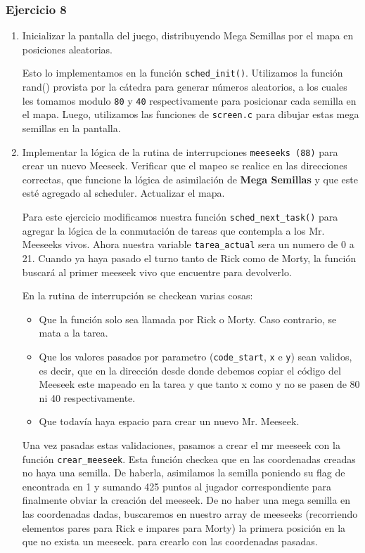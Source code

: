 \documentclass[a4paper]{article}
\begin{document}
\subsubsection{Ejercicio 8}

\begin{enumerate}
	\item Inicializar la pantalla del juego, distribuyendo Mega Semillas por el mapa en posiciones aleatorias.
	
	Esto lo implementamos en la funci\'on \texttt{sched\_init()}. Utilizamos la funci\'on rand() provista por la c\'atedra para generar números aleatorios, a los cuales les tomamos modulo \texttt{80} y \texttt{40} respectivamente para posicionar cada semilla en el mapa. Luego, utilizamos las funciones de \texttt{screen.c} para dibujar estas mega semillas en la pantalla.
	
	\item Implementar la l\'ogica de la rutina de interrupciones \texttt{meeseeks (88)} para crear un nuevo Meeseek. Verificar que el mapeo se realice en las direcciones correctas, que funcione la l\'ogica de asimilaci\'on de \textbf{Mega Semillas} y que este est\'e agregado al scheduler. Actualizar el mapa.
	
	Para este ejercicio modificamos nuestra funci\'on \texttt{sched\_next\_task()} para agregar la lógica de la conmutaci\'on de tareas que contempla a los Mr. Meeseeks vivos. Ahora nuestra variable \texttt{tarea\_actual} sera un numero de 0 a 21. Cuando ya haya pasado el turno tanto de Rick como de Morty, la funci\'on buscar\'a al primer meeseek vivo que encuentre para devolverlo.
	
	En la rutina de interrupci\'on se checkean varias cosas: 
	
	\begin{itemize}
		\item Que la funci\'on solo sea llamada por Rick o Morty. Caso contrario, se mata a la tarea.
		\item Que los valores pasados por parametro (\texttt{code\_start}, \texttt{x} e \texttt{y}) sean validos, es decir, que en la dirección desde donde debemos copiar el código del Meeseek este mapeado en la tarea y que tanto x como y no se pasen de 80 ni 40 respectivamente.
		\item Que todavía haya espacio para crear un nuevo Mr. Meeseek.
	\end{itemize}
	
	Una vez pasadas estas validaciones, pasamos a crear el mr meeseek con la funci\'on \texttt{crear\_meeseek}. Esta funci\'on checkea que en las coordenadas creadas no haya una semilla. De haberla, asimilamos la semilla poniendo su flag de encontrada en 1 y sumando 425 puntos al jugador correspondiente para finalmente obviar la creaci\'on del meeseek. De no haber una mega semilla en las coordenadas dadas, buscaremos en nuestro array de meeseeks (recorriendo elementos pares para Rick e impares para Morty) la primera posición en la que no exista un meeseek. para crearlo con las coordenadas pasadas.


\end{enumerate}
\end{document}

